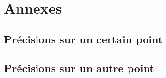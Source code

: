 \documentclass{ipgpmaster}
\begin{document}
\newpage


            
\newpage

\appendix %
\section{Annexes}
 
\subsection{Précisions sur un certain point}
  
\subsection{Précisions sur un autre point}
 
\cleardoublepage
  
\end{document}
